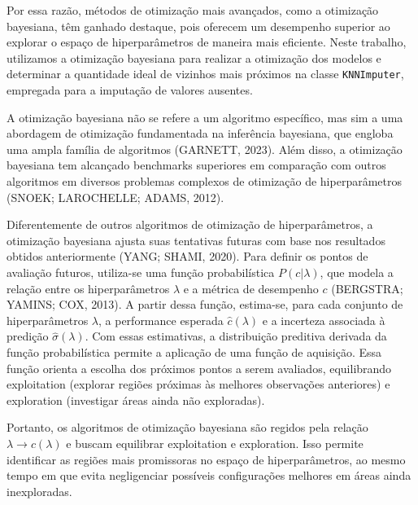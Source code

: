 \documentclass[
  12pt,
  a4paper,
]{scrreprt}
\begin{document}
Por essa razão, métodos de otimização mais avançados, como a otimização
bayesiana, têm ganhado destaque, pois oferecem um desempenho superior ao
explorar o espaço de hiperparâmetros de maneira mais eficiente. Neste
trabalho, utilizamos a otimização bayesiana para realizar a otimização
dos modelos e determinar a quantidade ideal de vizinhos mais próximos na
classe \texttt{KNNImputer}, empregada para a imputação de valores
ausentes.

\vspace{12pt}

A otimização bayesiana não se refere a um algoritmo específico, mas sim
a uma abordagem de otimização fundamentada na inferência bayesiana, que
engloba uma ampla família de algoritmos (GARNETT, 2023). Além disso, a
otimização bayesiana tem alcançado benchmarks superiores em comparação
com outros algoritmos em diversos problemas complexos de otimização de
hiperparâmetros (SNOEK; LAROCHELLE; ADAMS, 2012).

\vspace{12pt}

Diferentemente de outros algoritmos de otimização de hiperparâmetros, a
otimização bayesiana ajusta suas tentativas futuras com base nos
resultados obtidos anteriormente (YANG; SHAMI, 2020). Para definir os
pontos de avaliação futuros, utiliza-se uma função probabilística
\(P\left(c | \lambda \right)\), que modela a relação entre os
hiperparâmetros \(\lambda\) e a métrica de desempenho \(c\) (BERGSTRA;
YAMINS; COX, 2013). A partir dessa função, estima-se, para cada conjunto
de hiperparâmetros \(\lambda\), a performance esperada
\(\hat{c}\left(\lambda\right)\) e a incerteza associada à predição
\(\hat{\sigma}\left(\lambda\right)\). Com essas estimativas, a
distribuição preditiva derivada da função probabilística permite a
aplicação de uma função de aquisição. Essa função orienta a escolha dos
próximos pontos a serem avaliados, equilibrando exploitation (explorar
regiões próximas às melhores observações anteriores) e exploration
(investigar áreas ainda não exploradas).

\vspace{12pt}

Portanto, os algoritmos de otimização bayesiana são regidos pela relação
\(\lambda \rightarrow c\left(\lambda \right)\) e buscam equilibrar
exploitation e exploration. Isso permite identificar as regiões mais
promissoras no espaço de hiperparâmetros, ao mesmo tempo em que evita
negligenciar possíveis configurações melhores em áreas ainda
inexploradas.
\end{document}
